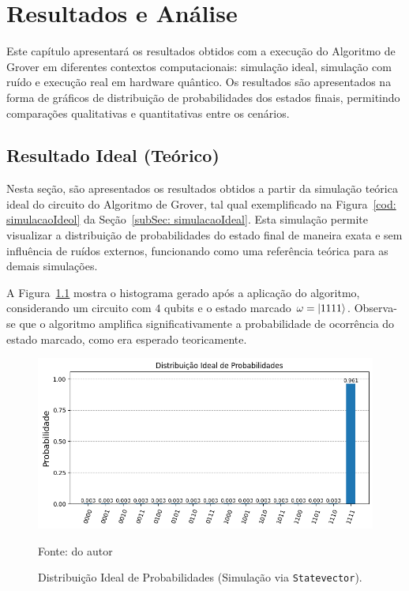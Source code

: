 \chapter{Resultados e Análise}
\label{chap: resultados}

Este capítulo apresentará os resultados obtidos com a execução do Algoritmo de Grover em diferentes contextos computacionais: simulação ideal, simulação com ruído e execução real em hardware quântico. Os resultados são apresentados na forma de gráficos de distribuição de probabilidades dos estados finais, permitindo comparações qualitativas e quantitativas entre os cenários.

\section{Resultado Ideal (Teórico)}
\label{sec: resultIdeal}

Nesta seção, são apresentados os resultados obtidos a partir da simulação teórica ideal do circuito do Algoritmo de Grover, tal qual exemplificado na Figura~\ref{cod: simulacaoIdeol} da Seção~\ref{subSec: simulacaoIdeal}. Esta simulação permite visualizar a distribuição de probabilidades do estado final de maneira exata e sem influência de ruídos externos, funcionando como uma referência teórica para as demais simulações.

A Figura~\ref{fig: resultIdeal} mostra o histograma gerado após a aplicação do algoritmo, considerando um circuito com $4$ qubits e o estado marcado $\omega = \ket{1111}$. Observa-se que o algoritmo amplifica significativamente a probabilidade de ocorrência do estado marcado, como era esperado teoricamente.

\begin{figure}[ht!]
    \centering
    \captionsetup{justification=centering}
    \caption{ Distribuição Ideal de Probabilidades (Simulação via \texttt{Statevector}).}
    \label{fig: resultIdeal}
    \includegraphics[width=.5\linewidth]{Imagens/resultIdeal.png}    
    
    {\small Fonte: do autor} 
\end{figure}

